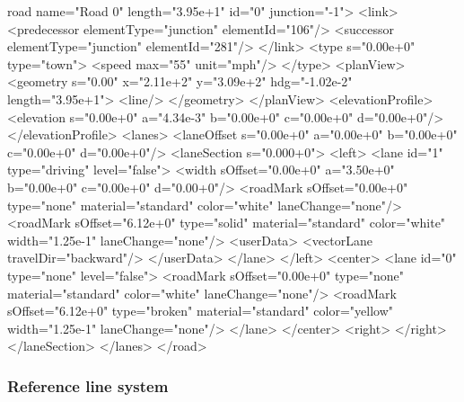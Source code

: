             \begin{minipage}{\textwidth}
            \begin{GenericCode}[caption={Example OpenDRIVE File~\cite{carlaGit}}, label={lst:xodr-file}]
road name="Road 0" length="3.95e+1" id="0" junction="-1">
    <link>
        <predecessor elementType="junction" elementId="106"/>
        <successor elementType="junction" elementId="281"/>
        </link>
            <type s="0.00e+0" type="town">
                <speed max="55" unit="mph"/>
            </type>
        <planView>
            <geometry s="0.00" x="2.11e+2" y="3.09e+2" hdg="-1.02e-2" length="3.95e+1">
                <line/>
            </geometry>
        </planView>
        <elevationProfile>
            <elevation s="0.00e+0" a="4.34e-3" b="0.00e+0" c="0.00e+0" d="0.00e+0"/>
        </elevationProfile>
        <lanes>
            <laneOffset s="0.00e+0" a="0.00e+0" b="0.00e+0" c="0.00e+0" d="0.00e+0"/>
            <laneSection s="0.000+0">
                <left>
                    <lane id="1" type="driving" level="false">
                        <width sOffset="0.00e+0" a="3.50e+0" b="0.00e+0" c="0.00e+0" d="0.00+0"/>
                        <roadMark sOffset="0.00e+0" type="none" material="standard" color="white" laneChange="none"/>
                        <roadMark sOffset="6.12e+0" type="solid" material="standard" color="white" width="1.25e-1" laneChange="none"/>
                        <userData>
                            <vectorLane travelDir="backward"/>
                        </userData>
                    </lane>
                </left>
                <center>
                    <lane id="0" type="none" level="false">
                        <roadMark sOffset="0.00e+0" type="none" material="standard" color="white" laneChange="none"/>
                        <roadMark sOffset="6.12e+0" type="broken" material="standard" color="yellow" width="1.25e-1" laneChange="none"/>
                    </lane>
                </center>
                <right>
                </right>
            </laneSection>
        </lanes>
    </road>
                \end{GenericCode}
                \end{minipage}

            \subsubsection{Reference line system}

